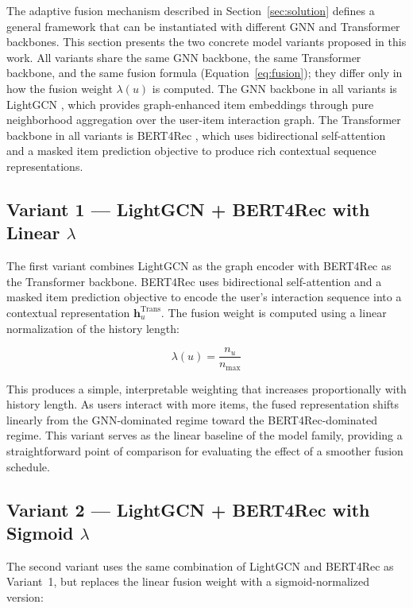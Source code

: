 \documentclass[12pt,a4paper]{report}
\begin{document}
The adaptive fusion mechanism described in Section~\ref{sec:solution} defines
a general framework that can be instantiated with different GNN and Transformer
backbones. This section presents the two concrete model variants proposed in
this work. All variants share the same GNN backbone, the same Transformer
backbone, and the same fusion formula (Equation~\ref{eq:fusion}); they differ
only in how the fusion weight \(\lambda(u)\) is computed. The GNN backbone in
all variants is LightGCN \citep{he2020lightgcn}, which provides graph-enhanced
item embeddings through pure neighborhood aggregation over the user-item
interaction graph. The Transformer backbone in all variants is BERT4Rec
\citep{sun2019bert4rec}, which uses bidirectional self-attention and a masked
item prediction objective to produce rich contextual sequence representations.

\subsection{Variant 1 --- LightGCN + BERT4Rec with Linear \(\lambda\)}

The first variant combines LightGCN \citep{he2020lightgcn} as the graph
encoder with BERT4Rec \citep{sun2019bert4rec} as the Transformer backbone.
BERT4Rec uses bidirectional self-attention and a masked item prediction
objective to encode the user's interaction sequence into a contextual
representation \(\mathbf{h}_u^{\text{Trans}}\). The fusion weight is computed
using a linear normalization of the history length:

\begin{equation}
    \lambda(u) = \frac{n_u}{n_{\max}}
    \label{eq:lambda_linear}
\end{equation}

\noindent This produces a simple, interpretable weighting that increases
proportionally with history length. As users interact with more items, the
fused representation shifts linearly from the GNN-dominated regime toward the
BERT4Rec-dominated regime. This variant serves as the linear baseline of the
model family, providing a straightforward point of comparison for evaluating
the effect of a smoother fusion schedule.

\subsection{Variant 2 --- LightGCN + BERT4Rec with Sigmoid \(\lambda\)}

The second variant uses the same combination of LightGCN and BERT4Rec as
Variant~1, but replaces the linear fusion weight with a sigmoid-normalized
version:
\end{document}
